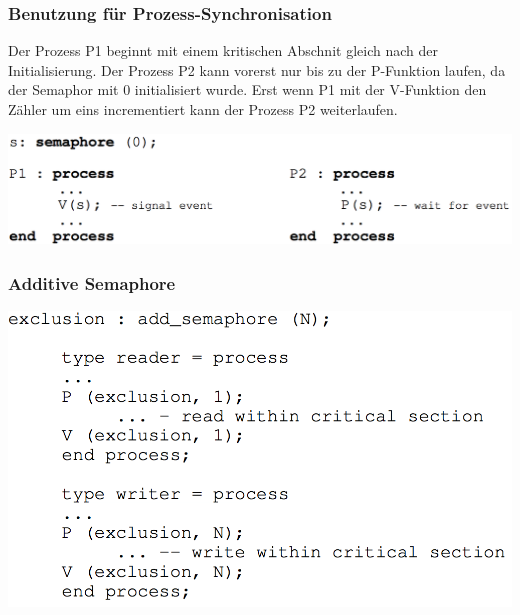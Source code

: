 \documentclass[10pt]{article}
\begin{document}
\subsubsection{Benutzung für Prozess-Synchronisation}
Der Prozess P1 beginnt mit einem kritischen Abschnit gleich nach der Initialisierung. Der Prozess P2 kann vorerst nur bis zu der P-Funktion laufen, da der Semaphor mit 0 initialisiert wurde. Erst wenn P1 mit der V-Funktion den Zähler um eins incrementiert kann der Prozess P2 weiterlaufen.
\begin{center}
	\includegraphics[scale=0.25]{semaphore-benutzung-synchronisation.png}\\
\end{center}

\subsubsection{Additive Semaphore}
\begin{center}
	\includegraphics[scale=0.25]{semaphore-additive.png}\\
\end{center}
\end{document}
